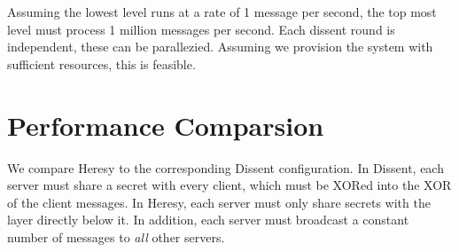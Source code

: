 Assuming the lowest level runs at a rate of 1 message per second, the top most level must process 1 million messages per second. Each dissent round is independent, these can be parallezied. Assuming we provision the system with sufficient resources, this is feasible.

\section{Performance Comparsion}

We compare Heresy to the corresponding Dissent configuration. In Dissent, each server must share a secret with every client, which must be XORed into the XOR of the client messages. In Heresy, each server must only share secrets with the layer directly below it. In addition, each server must broadcast a constant number of messages to \emph{all} other servers. 

